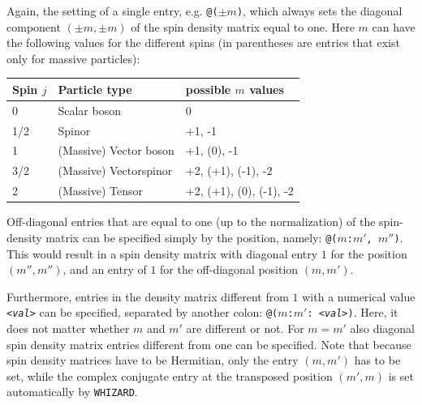 \documentclass[12pt]{book}
\newcommand{\ttt}[1]{\texttt{#1}}
\newcommand{\whizard}{\ttt{WHIZARD}}
\begin{document}
Again, the setting of a single entry, e.g. \ttt{@($\pm m$)}, which
always sets the diagonal component $(\pm m, \pm m)$ of the spin
density matrix equal to one. Here $m$ can have the following values
for the different spins (in parentheses are entries that exist only
for massive particles):

\vspace{1mm}

\begin{center}
\begin{tabular}{|l|l|l|}\hline
  Spin $j$ & Particle type & possible $m$ values \\\hline
  0   & Scalar boson           & 0 \\
  1/2 & Spinor                 & +1, -1 \\
  1   & (Massive) Vector boson & +1, (0), -1 \\
  3/2 & (Massive) Vectorspinor & +2, (+1), (-1), -2 \\
  2   & (Massive) Tensor       & +2, (+1), (0), (-1), -2
  \\\hline
\end{tabular}
\end{center}

\vspace{1mm}

Off-diagonal entries that are equal to one (up to the normalization)
of the spin-density matrix can be specified simply by the position,
namely: \ttt{@($m$:$m'$, $m''$)}. This would result in a spin density
matrix with diagonal entry $1$ for the position $(m'', m'')$, and an entry
of $1$ for the off-diagonal position $(m,m')$.

Furthermore, entries in the density matrix different from $1$ with a
numerical value \ttt{{\em <val>}} can be
specified, separated by another colon: \ttt{@($m$:$m'$:{\em
<val>})}. Here, it does not matter whether $m$ and $m'$ are different
or not. For $m = m'$ also diagonal spin density matrix entries
different from one can be specified. Note that because spin density
matrices have to be Hermitian, only the entry $(m,m')$ has to be set,
while the complex conjugate entry at the transposed position $(m',m)$
is set automatically by \whizard.
\end{document}
